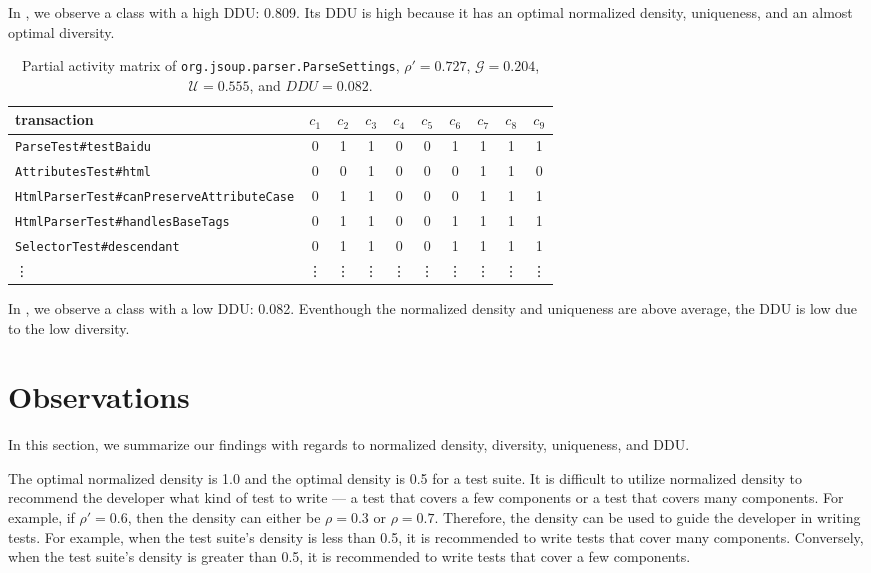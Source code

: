 \documentclass[twoside,a4paper,11pt]{memoir}
\begin{document}
In , we observe a class with a high DDU\@: 0.809.
Its DDU is high because it has an optimal normalized density, uniqueness, and an almost optimal diversity.

\begin{table}[]
\scriptsize
\centering
\caption{Partial activity matrix of \texttt{org.jsoup.parser.ParseSettings}, \(\rho' = 0.727 \), \(\mathcal{G} = 0.204 \), \(\mathcal{U} = 0.555 \), and \(DDU = 0.082\).}%
\label{tab:parsesettings}
\begin{tabular}{l|ccccccccc}
transaction & \(c_1 \) & \(c_2 \) & \(c_3 \) & \(c_4 \) & \(c_5 \) & \(c_6 \) & \(c_7 \) & \(c_8 \) & \(c_9 \) \\ \hline
\texttt{ParseTest\#testBaidu} & 0 & 1 & 1 & 0 & 0 & 1 & 1 & 1 & 1 \\
\texttt{AttributesTest\#html} & 0 & 0 & 1 & 0 & 0 & 0 & 1 & 1 & 0 \\
\texttt{HtmlParserTest\#canPreserveAttributeCase} & 0 & 1 & 1 & 0 & 0 & 0 & 1 & 1 & 1 \\
\texttt{HtmlParserTest\#handlesBaseTags} & 0 & 1 & 1 & 0 & 0 & 1 & 1 & 1 & 1 \\
\texttt{SelectorTest\#descendant} & 0 & 1 & 1 & 0 & 0 & 1 & 1 & 1 & 1 \\
\vdots & \vdots & \vdots & \vdots & \vdots & \vdots & \vdots & \vdots & \vdots & \vdots
\end{tabular}
\end{table}

In , we observe a class with a low DDU\@: 0.082.
Eventhough the normalized density and uniqueness are above average, the DDU is low due to the low diversity.

\section{Observations}
In this section, we summarize our findings with regards to normalized density, diversity, uniqueness, and DDU\@.

The optimal normalized density is 1.0 and the optimal density is 0.5 for a test suite.
It is difficult to utilize normalized density to recommend the developer what kind of test to write --- a test that covers a few components or a test that covers many components.
For example, if \(\rho' = 0.6 \), then the density can either be \(\rho = 0.3 \) or \(\rho = 0.7 \).
Therefore, the density can be used to guide the developer in writing tests.
For example, when the test suite's density is less than 0.5, it is recommended to write tests that cover many components.
Conversely, when the test suite's density is greater than 0.5, it is recommended to write tests that cover a few components.
\end{document}
